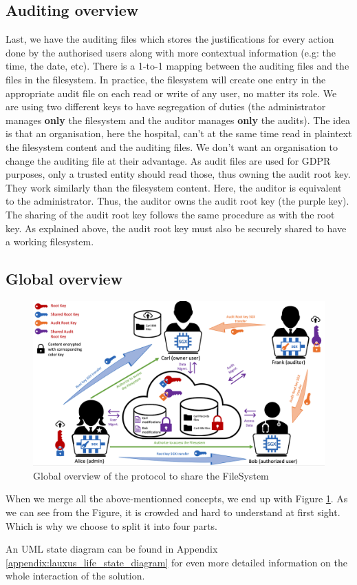 \documentclass[../main.tex]{subfiles}
\begin{document}
\subsection{Auditing overview}
\label{section:lauxus:approach_audit}
\par Last, we have the auditing files which stores the justifications for every action done by the authorised users along with more contextual information (e.g: the time, the date, etc). There is a 1-to-1 mapping between the auditing files and the files in the filesystem. In practice, the filesystem will create one entry in the appropriate audit file on each read or write of any user, no matter its role. We are using two different keys to have segregation of duties (the administrator manages \textbf{only} the filesystem and the auditor manages \textbf{only} the audits). The idea is that an organisation, here the hospital, can't at the same time read in plaintext the filesystem content and the auditing files. We don't want an organisation to change the auditing file at their advantage. As audit files are used for GDPR purposes, only a trusted entity should read those, thus owning the audit root key. They work similarly than the filesystem content. Here, the auditor is equivalent to the administrator. Thus, the auditor owns the audit root key (the purple key). The sharing of the audit root key follows the same procedure as with the root key. As explained above, the audit root key must also be securely shared to have a working filesystem.

\newpage
\subsection{Global overview}
\label{section:lauxus:approach_global}
\begin{figure}[h]
    \centering
    \includegraphics[width=\textwidth]{images/lauxus/approach_global}
    
    \caption{Global overview of the protocol to share the FileSystem}
    \label{figure:lauxus:approach_global}
\end{figure}
\par When we merge all the above-mentionned concepts, we end up with Figure \ref{figure:lauxus:approach_global}. As we can see from the Figure, it is crowded and hard to understand at first sight. Which is why we choose to split it into four parts.
\par An UML state diagram can be found in Appendix \ref{appendix:lauxus_life_state_diagram} for even more detailed information on the whole interaction of the solution.
\end{document}
